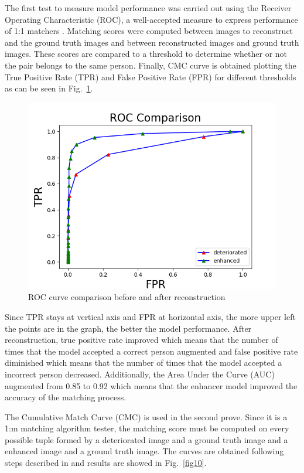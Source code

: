 \documentclass[a4paper,fleqn]{cas-dc}
\begin{document}
The first test to measure model performance was carried out using the Receiver Operating Characteristic (ROC), a well-accepted measure to express performance of 1:1 matchers \cite{RROCCMC}. Matching scores were computed between images to reconstruct and the ground truth images and between reconstructed images and ground truth images. These scores are compared to a threshold to determine whether or not the pair belongs to the same person. Finally, CMC curve is obtained plotting the True Positive Rate (TPR) and False Positive Rate (FPR) for different thresholds as can be seen in Fig.~\ref{fig9}.

\begin{figure}[htbp]
\centerline{\includegraphics[scale=0.5]{figs/roc_comparison.png}}
\caption{ROC curve comparison before and after reconstruction}
\label{fig9}
\end{figure}

Since TPR stays at vertical axis and FPR at horizontal axis, the more upper left the points are in the graph, the better the model performance. After reconstruction, true positive rate improved which means that the number of times that the model accepted a correct person augmented and false positive rate diminished which means that the number of times that the model accepted a incorrect person decreased. Additionally, the Area Under the Curve (AUC) augmented from 0.85 to 0.92 which means that the enhancer model improved the accuracy of the matching process.

The Cumulative Match Curve (CMC) is used in the second prove. Since it is a 1:m matching algorithm tester, the matching score must be computed on every possible tuple formed by a deteriorated image and a ground truth image and a enhanced image and a ground truth image. The curves are obtained following steps described in \cite{RROCCMC} and results are showed in Fig.~\ref{fig10}.
\end{document}
